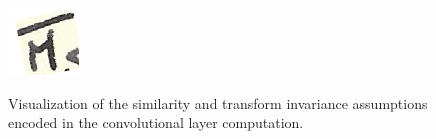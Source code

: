 \documentclass{article}
\begin{document}
\begin{figure}[h]
{\begin{minipage}[b]{0.45\linewidth}
            \includegraphics[width=\textwidth]{../images/rotated_molar.png}
            \label{fig:snowfall4}
        \end{minipage}
    }

    \caption{Visualization of the similarity and transform invariance assumptions encoded in the convolutional layer computation.}
    \label{fig:conv_assumptions}
\end{figure}
\end{document}
